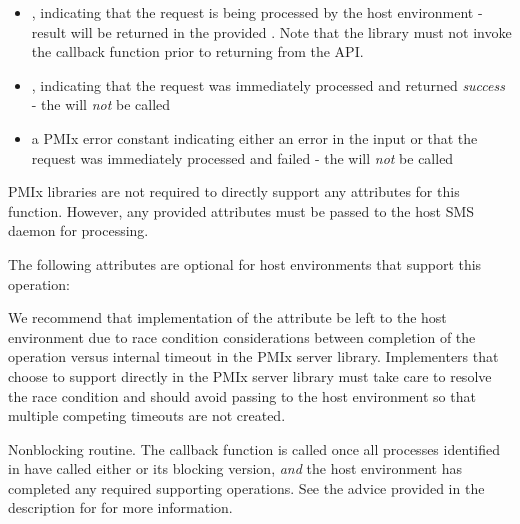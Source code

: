 \begin{itemize}
    \item {}, indicating that the request is being processed by the host environment - result will be returned in the provided . Note that the library must not invoke the callback function prior to returning from the \ac{API}.
    \item {}, indicating that the request was immediately processed and returned \textit{success} - the  will \textit{not} be called
    \item a PMIx error constant indicating either an error in the input or that the request was immediately processed and failed - the  will \textit{not} be called
\end{itemize}

\reqattrstart
\ac{PMIx} libraries are not required to directly support any attributes for this function. However, any provided attributes must be passed to the host \ac{SMS} daemon for processing.

\reqattrend

\optattrstart
The following attributes are optional for host environments that support this operation:


\optattrend

\adviceimplstart
We recommend that implementation of the  attribute be left to the host environment due to race condition considerations between completion of the operation versus internal timeout in the \ac{PMIx} server library. Implementers that choose to support  directly in the \ac{PMIx} server library must take care to resolve the race condition and should avoid passing  to the host environment so that multiple competing timeouts are not created.
\adviceimplend

\descr

Nonblocking  routine. The callback function is called once all processes identified in  have called either  or its blocking version, \textit{and} the host environment has completed any required supporting operations. See the advice provided in the description for  for more information.
